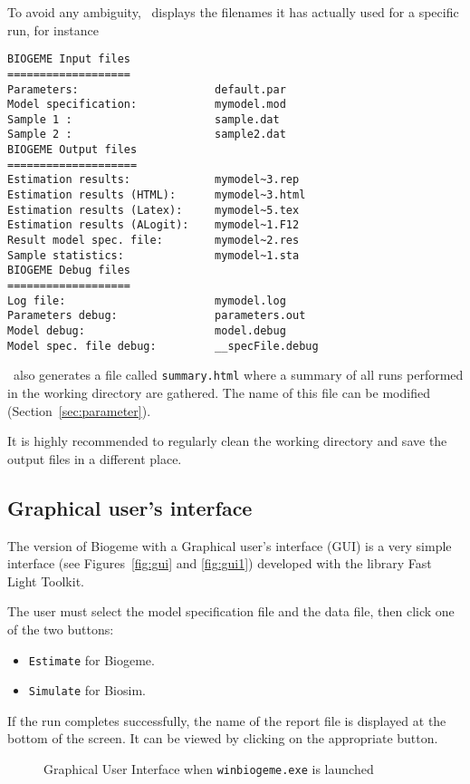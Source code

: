 \documentclass[12pt]{memoir}
\begin{document}
To avoid any ambiguity, \BIOGEME\ displays the filenames it has actually used for a specific run, 
for instance
{\footnotesize
\begin{verbatim}
BIOGEME Input files
===================
Parameters:                     default.par
Model specification:            mymodel.mod
Sample 1 :                      sample.dat
Sample 2 :                      sample2.dat
BIOGEME Output files
====================
Estimation results:             mymodel~3.rep
Estimation results (HTML):      mymodel~3.html
Estimation results (Latex):     mymodel~5.tex
Estimation results (ALogit):    mymodel~1.F12
Result model spec. file:        mymodel~2.res
Sample statistics:              mymodel~1.sta
BIOGEME Debug files
===================
Log file:                       mymodel.log
Parameters debug:               parameters.out
Model debug:                    model.debug
Model spec. file debug:         __specFile.debug
\end{verbatim}
}

\BIOGEME\ also generates a file called \verb+summary.html+ where a
summary of all runs performed in the working directory are
gathered. The name of this file can be modified (Section~\ref{sec:parameter}).

It is highly recommended to regularly clean the working directory and
save the output files in a different place.

\subsection{Graphical user's interface}

The version of Biogeme with a Graphical user's interface (GUI) is a very simple  interface (see Figures~\vref{fig:gui} and \vref{fig:gui1}) developed with the library Fast Light Toolkit.

The user must select the model specification file and the data file, then click one of the two buttons:
\begin{itemize}
\item \texttt{Estimate} for Biogeme.
\item \texttt{Simulate} for Biosim.
\end{itemize}
If the run completes successfully, the name of the report file is
displayed at the bottom of the screen. It can be viewed by clicking on
the appropriate button.

\begin{figure}[htbf]
\begin{center}
\caption{\label{fig:gui}Graphical User Interface when \texttt{winbiogeme.exe} is launched}
\end{center}

\end{figure}
\end{document}
